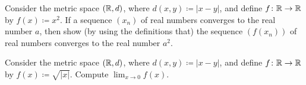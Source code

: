 \documentclass[../main.tex]{subfiles}
\begin{document}
\begin{homework}
    Consider the metric space $(\mathbb R,d)$, where $d(x,y)\coloneqq|x-y|$, and define $f\colon\mathbb R\to\mathbb R$ by $f(x)\coloneqq x^2$. If a sequence $(x_n)$ of real numbers converges to the real number $a$, then show (by using the definitions that) the sequence $(f(x_n))$ of real numbers converges to the real number $a^2$.
\end{homework}

\begin{homework}
    Consider the metric space $(\mathbb R,d)$, where $d(x,y)\coloneqq|x-y|$, and define $f\colon\mathbb R\to\mathbb R$ by $f(x)\coloneqq\sqrt{|x|}$. Compute $\lim_{x\to0}f(x)$.
\end{homework}
\end{document}
